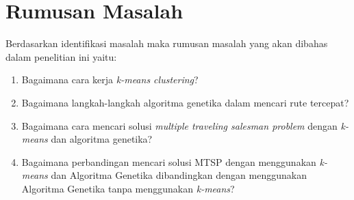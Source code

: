 \section{Rumusan Masalah}

Berdasarkan identifikasi masalah maka rumusan masalah yang akan dibahas dalam penelitian ini yaitu:
\begin{enumerate}
    \item Bagaimana cara kerja \textit{k-means clustering}?
    \item Bagaimana langkah-langkah algoritma genetika dalam mencari rute tercepat?
    \item Bagaimana cara mencari solusi \textit{multiple traveling salesman problem} dengan \textit{k-means} dan algoritma genetika?
    \item Bagaimana perbandingan mencari solusi MTSP dengan menggunakan \textit{k-means} dan Algoritma Genetika dibandingkan dengan menggunakan Algoritma Genetika tanpa menggunakan \textit{k-means}?
\end{enumerate}